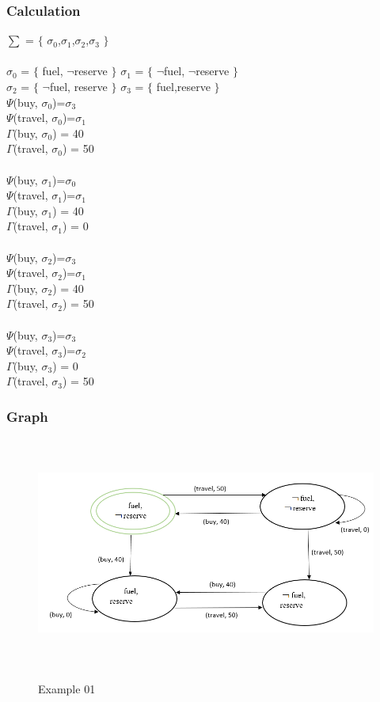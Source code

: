 \documentclass[11pt]{article}
\begin{document}
	\subsubsection{Calculation}\label{par:p301}\par
	$\sum$ = $\lbrace$ $\sigma_{0}$,$\sigma_{1}$,$\sigma_{2}$,$\sigma_{3}$ $\rbrace$\\ \\
	$\sigma_{0}$ = $\lbrace$ fuel, $\neg$reserve $\rbrace$ \indent $\sigma_{1}$ = $\lbrace$ $\neg$fuel, $\neg$reserve $\rbrace$\\
	$\sigma_{2}$ = $\lbrace$ $\neg$fuel, reserve $\rbrace$ \indent 	
	$\sigma_{3}$ = $\lbrace$ fuel,reserve $\rbrace$
	\\
	$\Psi$(buy, $\sigma_{0}$)=$\sigma_{3}$\\ 
	$\Psi$(travel, $\sigma_{0}$)=$\sigma_{1}$\\
	\(\Gamma\)(buy, $\sigma_{0}$) = 40\\
	\(\Gamma\)(travel, $\sigma_{0}$) = 50\\
	\\
	$\Psi$(buy, $\sigma_{1}$)=$\sigma_{0}$\\ 
	$\Psi$(travel, $\sigma_{1}$)=$\sigma_{1}$\\
	\(\Gamma\)(buy, $\sigma_{1}$) = 40\\
	\(\Gamma\)(travel, $\sigma_{1}$) = 0\\
	\\
	$\Psi$(buy, $\sigma_{2}$)=$\sigma_{3}$\\ 
	$\Psi$(travel, $\sigma_{2}$)=$\sigma_{1}$\\
	\(\Gamma\)(buy, $\sigma_{2}$) = 40\\
	\(\Gamma\)(travel, $\sigma_{2}$) = 50\\
	\\
	$\Psi$(buy, $\sigma_{3}$)=$\sigma_{3}$\\ 
	$\Psi$(travel, $\sigma_{3}$)=$\sigma_{2}$\\
	\(\Gamma\)(buy, $\sigma_{3}$) = 0\\
	\(\Gamma\)(travel, $\sigma_{3}$) = 50\\
	\subsubsection{Graph}\label{par:p401}
	\begin{figure}[H]
		\centering
		\includegraphics[width=6in,height=3in]{./media/ex01.png}
		\label{Figure:f01}
		\caption{Example 01}
	\end{figure}
\end{document}
